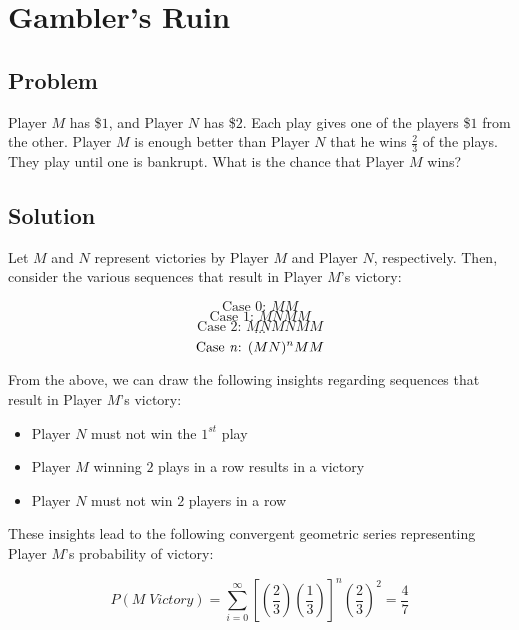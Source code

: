 \documentclass{article}
\date{}
\author{Kaan Aksoy | March 8, 2020}
\begin{document}
\maketitle
\section{Gambler's Ruin}
\subsection{Problem}

Player $M$ has \$$1$, and Player $N$ has \$$2$. Each play gives 
one of the players \$$1$ from the other. Player $M$ is enough 
better than Player $N$ that he wins $\frac{2}{3}$ of the plays. 
They play until one is bankrupt. What is the chance that 
Player $M$ wins?							

\subsection{Solution}

Let $M$ and $N$ represent victories by Player $M$ and Player $N$, 
respectively. Then, consider the various sequences that 
result in Player $M$'s victory: 

$$\text{Case 0: } M M $$
$$\text{Case 1: } M N M M $$
$$\text{Case 2: } M N M N M M $$
$$ \text{\ldots} $$
$$\text{Case \textit{n}: } (M N)^n M M $$

From the above, we can draw the following 
insights regarding sequences that result in Player $M$'s 
victory:

\vspace{0.3cm}

\begin{itemize}
    \item Player $N$ must not win the $1^{st}$ play
    \item Player $M$ winning $2$ plays in a row results in a victory
    \item Player $N$ must not win $2$ players in a row
\end{itemize}

\vspace{0.3cm}

These insights lead to the following convergent geometric 
series representing Player $M$'s probability of victory: 

$$ P(M\; Victory) = \sum_{i=0}^{\infty} \left[ 
\left( \frac{2}{3} \right) \left( \frac{1}{3}\right) \right] ^n\left(\frac{2}{3}\right)^2 = \frac{4}{7} $$
\end{document}

